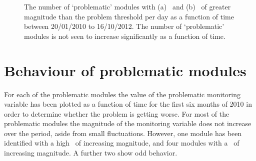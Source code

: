 \begin{figure}
	\centering
	\caption{The number of `problematic' modules with (a) \deltat\ and (b)
        \tdiff\ of greater magnitude than the problem threshold per day as a
        function of time between 20/01/2010 to 16/10/2012. The number of
        `problematic' modules is not seen to increase significantly as a
        function of time.}
	\label{fig:num_pm}
\end{figure}

\section{Behaviour of problematic modules}

For each of the problematic modules the value of the problematic monitoring
variable has been plotted as a function of time for the first six months of 2010
in order to determine whether the problem is getting worse. For most of the
problematic modules the magnitude of the monitoring variable does not increase
over the period, aside from small fluctuations.  However, one module has been
identified with a high \deltat\ of increasing magnitude, and four modules with a
\tdiff\ of increasing magnitude. A further two show odd behavior. 

